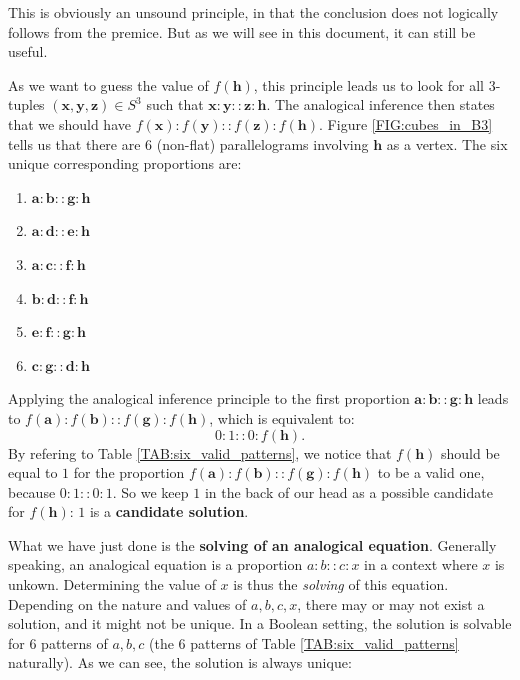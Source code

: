 This is obviously an unsound principle, in that the conclusion does not
logically follows from the premice. But as we will see in this document, it can
still be useful.

As we want to guess the value of $f(\mathbf{h})$, this principle leads us to
look for all 3-tuples $(\mathbf{x}, \mathbf{y}, \mathbf{z}) \in S^3$ such that
$\mathbf{x}:\mathbf{y}::\mathbf{z}:\mathbf{h}$.  The analogical inference then
states that we should have
$f(\mathbf{x}):f(\mathbf{y})::f(\mathbf{z}):f(\mathbf{h})$. Figure
\ref{FIG:cubes_in_B3} tells us that there are 6 (non-flat) parallelograms
involving $\mathbf{h}$ as a vertex. The six unique corresponding proportions
are:

\begin{enumerate}
  \item $\mathbf{a} : \mathbf{b} :: \mathbf{g} : \mathbf{h}$
  \item $\mathbf{a} : \mathbf{d} :: \mathbf{e} : \mathbf{h}$
  \item $\mathbf{a} : \mathbf{c} :: \mathbf{f} : \mathbf{h}$
  \item $\mathbf{b} : \mathbf{d} :: \mathbf{f} : \mathbf{h}$
  \item $\mathbf{e} : \mathbf{f} :: \mathbf{g} : \mathbf{h}$
  \item $\mathbf{c} : \mathbf{g} :: \mathbf{d} : \mathbf{h}$
\end{enumerate}

Applying the analogical inference principle to the first proportion $\mathbf{a}
: \mathbf{b} :: \mathbf{g} : \mathbf{h}$ leads to $f(\mathbf{a}) :
f(\mathbf{b}) :: f(\mathbf{g}) : f(\mathbf{h})$, which is equivalent to:
$$0:1::0:f(\mathbf{h}).$$ By refering to Table \ref{TAB:six_valid_patterns}, we
notice that $f(\mathbf{h})$ should be equal to $1$ for the proportion
$f(\mathbf{a}) : f(\mathbf{b}) :: f(\mathbf{g}) : f(\mathbf{h})$ to be a valid
one, because $0:1::0:1$. So we keep $1$ in the back of our head as a possible
candidate for $f(\mathbf{h})$: $1$ is a \textbf{candidate solution}.

What we have just done is the \textbf{solving of an analogical equation}.
Generally speaking, an analogical equation is a proportion $a:b::c:x$ in a
context where $x$ is unkown. Determining the value of $x$ is thus the
\textit{solving} of this equation. Depending on the nature and values of $a, b,
c, x$, there may or may not exist a solution, and it might not be unique. In a
Boolean setting, the solution is solvable for 6 patterns of $a, b, c$ (the 6
patterns of Table \ref{TAB:six_valid_patterns} naturally). As we can see, the
solution is always unique:

